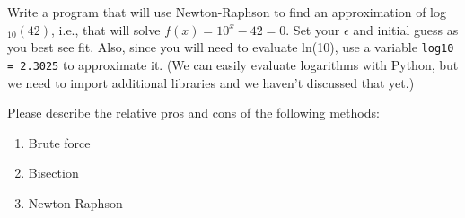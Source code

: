 \documentclass[12pt]{article}%
\newcommand{\code}[1]{\texttt{#1}}
\begin{document}
\begin{Exercise}[origin={10 points, Python}]

Write a program that will use Newton-Raphson to find an approximation of log$_{10}(42)$, i.e., that will solve $f(x) = 10^x - 42 = 0$. Set your $\epsilon$ and initial guess as you best see fit. Also, since you will need to evaluate ln(10), use a variable \code{log10 = 2.3025} to approximate it. (We can easily evaluate logarithms with Python, but we need to import additional libraries and we haven't discussed that yet.)

\end{Exercise}

\pagebreak

\begin{Exercise}[origin={10 points, Short Answer}]

Please describe the relative pros and cons of the following methods:
\begin{enumerate}
	\item Brute force
	\item Bisection
	\item Newton-Raphson
\end{enumerate}

\end{Exercise}
\end{document}
